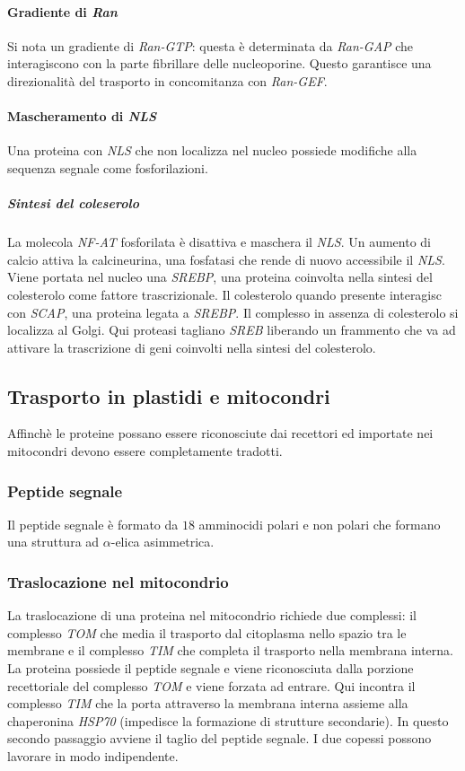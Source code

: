 			\paragraph{Gradiente di \emph{Ran}}
			Si nota un gradiente di \emph{Ran-GTP}: questa \`e determinata da \emph{Ran-GAP} che interagiscono con la parte fibrillare delle nucleoporine.
			Questo garantisce una direzionalit\`a del trasporto in concomitanza con \emph{Ran-GEF}.

			\paragraph{Mascheramento di \emph{NLS}}
			Una proteina con \emph{NLS} che non localizza nel nucleo possiede modifiche alla sequenza segnale come fosforilazioni.
	
				\subparagraph{Sintesi del coleserolo}
				La molecola \emph{NF-AT} fosforilata \`e disattiva e maschera il \emph{NLS}.
				Un aumento di calcio attiva la calcineurina, una fosfatasi che rende di nuovo accessibile il \emph{NLS}.
				Viene portata nel nucleo una \emph{SREBP}, una proteina coinvolta nella sintesi del colesterolo come fattore trascrizionale.
				Il colesterolo quando presente interagisc con \emph{SCAP}, una proteina legata a \emph{SREBP}.
				Il complesso in assenza di colesterolo si localizza al Golgi.
				Qui proteasi tagliano \emph{SREB} liberando un frammento che va ad attivare la trascrizione di geni coinvolti nella sintesi del colesterolo.



	\subsection{Trasporto in plastidi e mitocondri}
	Affinch\`e le proteine possano essere riconosciute dai recettori ed importate nei mitocondri devono essere completamente tradotti.

		\subsubsection{Peptide segnale}
		Il peptide segnale \`e formato da $18$ amminocidi polari e non polari che formano una struttura ad $\alpha$-elica asimmetrica.

		\subsubsection{Traslocazione nel mitocondrio}
		La traslocazione di una proteina nel mitocondrio richiede due complessi: il complesso \emph{TOM} che media il trasporto dal citoplasma nello spazio tra le membrane e il complesso \emph{TIM} che completa il trasporto nella membrana interna.
		La proteina possiede il peptide segnale e viene riconosciuta dalla porzione recettoriale del complesso \emph{TOM} e viene forzata ad entrare.
		Qui incontra il complesso \emph{TIM} che la porta attraverso la membrana interna assieme alla chaperonina \emph{HSP70} (impedisce la formazione di strutture secondarie).
		In questo secondo passaggio avviene il taglio del peptide segnale.
		I due copessi possono lavorare in modo indipendente.

